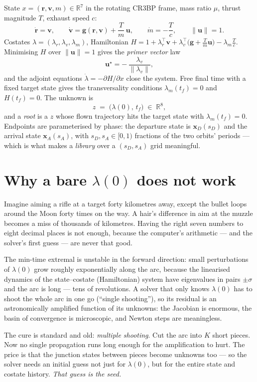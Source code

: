 \documentclass[11pt]{article}
\newcommand{\lv}{\lambda_v}\newcommand{\lr}{\lambda_r}\newcommand{\lm}{\lambda_m}
\newcommand{\tf}{t_f}\newcommand{\R}{\mathbb{R}}
\newcommand{\sD}{s_D}\newcommand{\sA}{s_A}
\begin{document}
\begin{rig}
State $x = (\bm r, \bm v, m)\in\R^7$ in the rotating CR3BP frame, mass ratio
$\mu$, thrust magnitude $T$, exhaust speed $c$:
\[
\dot{\bm r} = \bm v,\qquad
\dot{\bm v} = \bm g(\bm r,\bm v) + \frac{T}{m}\,\bm u,\qquad
\dot m = -\frac{T}{c},\qquad \|\bm u\|=1 .
\]
Costates $\lambda=(\lr,\lv,\lm)$, Hamiltonian
$H = 1 + \lr^{\!\top}\bm v + \lv^{\!\top}\!\big(\bm g + \tfrac{T}{m}\bm u\big) - \lm \tfrac{T}{c}$.
Minimising $H$ over $\|\bm u\|=1$ gives the \emph{primer vector} law
\[
\bm u^\star = -\,\frac{\lv}{\|\lv\|},
\]
and the adjoint equations $\dot\lambda = -\partial H/\partial x$ close the
system. Free final time with a fixed target state gives the transversality
conditions $\lm(\tf)=0$ and $H(\tf)=0$. The unknown is
\[
z \;=\; \big(\lambda(0),\, \tf\big) \;\in\; \R^8,
\]
and a \emph{root} is a $z$ whose flown trajectory hits the target state with
$\lm(\tf)=0$. Endpoints are parameterised by phase: the departure state is
$\bm x_D(\sD)$ and the arrival state $\bm x_A(\sA)$, with $\sD,\sA\in[0,1)$
fractions of the two orbits' periods --- which is what makes a \emph{library}
over a $(\sD,\sA)$ grid meaningful.
\end{rig}

\section{Why a bare $\lambda(0)$ does not work}\label{sec:why}

\begin{eli}
Imagine aiming a rifle at a target forty kilometres away, except the bullet
loops around the Moon forty times on the way. A hair's difference in aim at
the muzzle becomes a miss of thousands of kilometres. Having the right seven
numbers to eight decimal places is not enough, because the computer's
arithmetic --- and the solver's first guess --- are never that good.
\end{eli}

\begin{intu}
The min-time extremal is unstable in the forward direction: small
perturbations of $\lambda(0)$ grow roughly exponentially along the arc,
because the linearised dynamics of the state--costate (Hamiltonian) system
have eigenvalues in pairs $\pm\sigma$ and the arc is long --- tens of
revolutions. A solver that only knows $\lambda(0)$ has to shoot the whole arc
in one go (``single shooting''), so its residual is an astronomically
amplified function of its unknowns: the Jacobian is enormous, the basin of
convergence is microscopic, and Newton steps are meaningless.

The cure is standard and old: \emph{multiple shooting}. Cut the arc into $K$
short pieces. Now no single propagation runs long enough for the
amplification to hurt. The price is that the junction states between pieces
become unknowns too --- so the solver needs an initial guess not just for
$\lambda(0)$, but for the entire state and costate history. \emph{That guess
is the seed.}
\end{intu}
\end{document}
